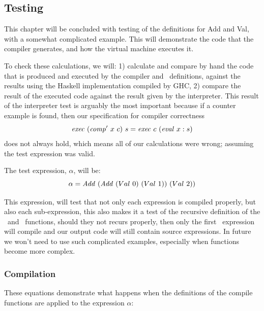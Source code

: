 \documentclass {article}
\begin{document}
\subsection{Testing}

This chapter will be concluded 
with testing
of the definitions for Add and Val, with a somewhat complicated
example.
This will demonstrate the code that the
compiler generates, and how the virtual machine executes it.

To check these calculations, we will:
1) calculate and compare by hand 
the code that is produced and executed
by the compiler and \vm\ definitions, 
against the results using the Haskell implementation
compiled by GHC,
2) compare the result of the executed code against the result
given by the interpreter. 
This result of the interpreter test is arguably the most
important because if a counter example is found,
then our specification for compiler correctness 
\[ \mathit{exec\ } (\mathit{comp'\ }  x\ c)\ s = \mathit{exec\ } c\ (\mathit{eval\ }  x : s) \]
does not always hold, 
which means all of our calculations were wrong;
assuming the test expression was valid.

The test expression, $\alpha$, will be:
\[ \alpha = \Add (\Add (Val\ 0)\ (Val\ 1))\ (Val\ 2)) \]

This expression, 
will test that not only each expression
is compiled properly, but also each sub-expression,
this also makes it a test of the
recursive definition of the \comp\ and \compp\ functions,
should they not recurs properly, then only the first
\add\ expression will compile and our output code will
still contain source expressions. 
In future we won't need to use such complicated examples, 
especially when functions become more complex.

\subsubsection{Compilation}

These equations demonstrate what happens
when the definitions of the compile functions are applied to
the expression $\alpha$:
\end{document}
